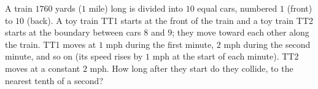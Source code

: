 A train $1760$ yards ($1$ mile) long is divided into $10$ equal cars, numbered $1$ (front) to $10$ (back). A toy train TT1 starts at the front of the train and a toy train TT2 starts at the boundary between cars $8$ and $9$; they move toward each other along the train. TT1 moves at $1$ mph during the first minute, $2$ mph during the second minute, and so on (its speed rises by $1$ mph at the start of each minute). TT2 moves at a constant $2$ mph. How long after they start do they collide, to the nearest tenth of a second?

